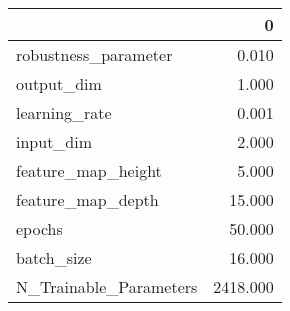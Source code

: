 \begin{tabular}{lr}
\toprule
{} &         0 \\
\midrule
robustness\_parameter   &     0.010 \\
output\_dim             &     1.000 \\
learning\_rate          &     0.001 \\
input\_dim              &     2.000 \\
feature\_map\_height     &     5.000 \\
feature\_map\_depth      &    15.000 \\
epochs                 &    50.000 \\
batch\_size             &    16.000 \\
N\_Trainable\_Parameters &  2418.000 \\
\bottomrule
\end{tabular}
